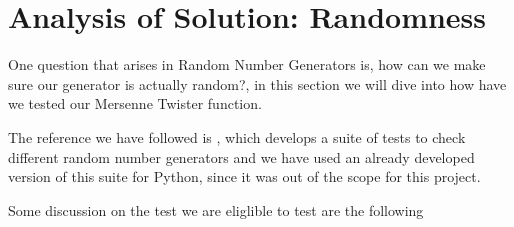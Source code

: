 \section{Analysis of Solution: Randomness}
One question that arises in Random Number Generators is, how can we make sure our generator is actually random?, in this section we will dive into how have we tested our Mersenne Twister function.

The reference we have followed is \cite{smid2010statistical}, which develops a suite of tests to check different random number generators and we have used an already developed version of this suite for Python\cite{InsaneMonster2022}, since it was out of the scope for this project. 

Some discussion on the test we are eliglible to test are the following


